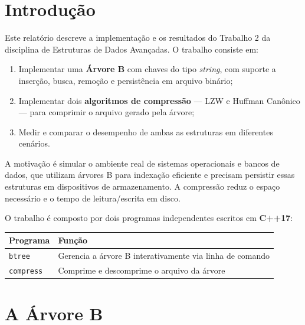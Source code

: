 \documentclass{ifpr-pinhais}
\begin{document}
\pretextual
\imprimircapa
\tableofcontents
\cleardoublepage

\textual

\section{Introdução}

Este relatório descreve a implementação e os resultados do Trabalho 2 da disciplina de Estruturas de Dados Avançadas. O trabalho consiste em:

\begin{enumerate}
    \item Implementar uma \textbf{Árvore B} com chaves do tipo \textit{string}, com suporte a inserção, busca, remoção e persistência em arquivo binário;
    \item Implementar dois \textbf{algoritmos de compressão} --- LZW e Huffman Canônico --- para comprimir o arquivo gerado pela árvore;
    \item Medir e comparar o desempenho de ambas as estruturas em diferentes cenários.
\end{enumerate}

A motivação é simular o ambiente real de sistemas operacionais e bancos de dados, que utilizam árvores B para indexação eficiente e precisam persistir essas estruturas em dispositivos de armazenamento. A compressão reduz o espaço necessário e o tempo de leitura/escrita em disco.

O trabalho é composto por dois programas independentes escritos em \textbf{C++17}:

\begin{center}
\begin{tabular}{ll}
\toprule
Programa & Função \\
\midrule
\texttt{btree} & Gerencia a árvore B interativamente via linha de comando \\
\texttt{compress} & Comprime e descomprime o arquivo da árvore \\
\bottomrule
\end{tabular}
\end{center}

\section{A Árvore B}
\end{document}
